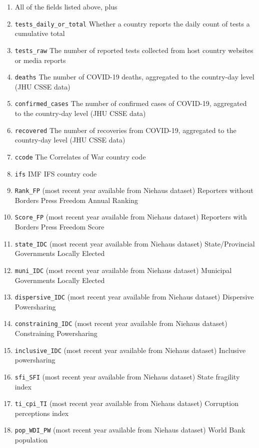 \documentclass[]{article}
\begin{document}
\begin{enumerate}
\def\labelenumi{\arabic{enumi}.}
\item
  All of the fields listed above, plus
\item
  \texttt{tests\_daily\_or\_total} Whether a country reports the daily count of tests a cumulative total
\item
  \texttt{tests\_raw} The number of reported tests collected from host country websites or media reports
\item
  \texttt{deaths} The number of COVID-19 deaths, aggregated to the country-day level (JHU CSSE data)
\item
  \texttt{confirmed\_cases} The number of confirmed cases of COVID-19, aggregated to the country-day level (JHU CSSE data)
\item
  \texttt{recovered} The number of recoveries from COVID-19, aggregated to the country-day level (JHU CSSE data)
\item
  \texttt{ccode} The Correlates of War country code
\item
  \texttt{ifs} IMF IFS country code
\item
  \texttt{Rank\_FP} (most recent year available from Niehaus dataset) Reporters without Borders Press Freedom Annual Ranking
\item
  \texttt{Score\_FP} (most recent year available from Niehaus dataset) Reporters with Borders Press Freedom Score
\item
  \texttt{state\_IDC} (most recent year available from Niehaus dataset) State/Provincial Governments Locally Elected
\item
  \texttt{muni\_IDC} (most recent year available from Niehaus dataset) Municipal Governments Locally Elected
\item
  \texttt{dispersive\_IDC} (most recent year available from Niehaus dataset) Dispersive Powersharing
\item
  \texttt{constraining\_IDC} (most recent year available from Niehaus dataset) Constraining Powersharing
\item
  \texttt{inclusive\_IDC} (most recent year available from Niehaus dataset) Inclusive powersharing
\item
  \texttt{sfi\_SFI} (most recent year available from Niehaus dataset) State fragility index
\item
  \texttt{ti\_cpi\_TI} (most recent year available from Niehaus dataset) Corruption perceptions index
\item
  \texttt{pop\_WDI\_PW} (most recent year available from Niehaus dataset) World Bank population

\end{enumerate}
\end{document}
